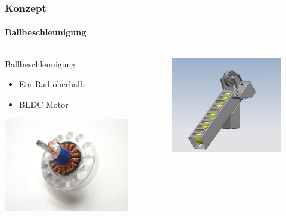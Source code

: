\begin{frame}
    \frametitle{Konzept}
    \framesubtitle{Ballbeschleunigung}
    \begin{columns}
        \begin{column}{0.4\textwidth}
            \begin{block}{Ballbeschleunigung}
                \begin{itemize}
                    \item Ein Rad oberhalb
                    \item<2-> BLDC Motor
                \end{itemize}
            \end{block}
            \centering
            \pause
            \includegraphics[width=0.8\textwidth, trim = 330mm 200mm 300mm 100mm, clip]{../fig/bldc/DSC02754.JPG}
        \end{column}
        \begin{column}{0.6\textwidth}
            \centering
            \onslide
            \includegraphics[width=0.8\textwidth, trim = 40mm 0mm 60mm 30mm, clip]{../doc/fig/Balllager.jpg}
        \end{column}
    \end{columns}
\end{frame}

